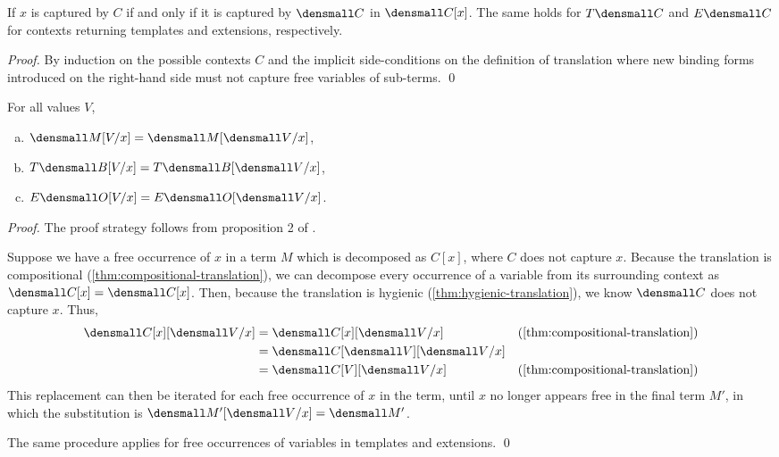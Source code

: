 \begin{lemma}[Hygiene]
  \label{thm:hygienic-translation}

  If $x$ is captured by $C$ if and only if it is captured by $\den{C}$ in $\den{C}{[x]}$.
  The same holds for $T\den{C}$ and $E\den{C}$ for contexts returning templates and extensions, respectively.
\end{lemma}
\begin{proof}
  By induction on the possible contexts $C$ and the implicit side-conditions on the definition of translation where new binding forms introduced on the right-hand side must not capture free variables of sub-terms.
  \qed
\end{proof}

\begin{lemma}[Substitution]
  \label{thm:substitution-translation}
  For all values $V$,
  \begin{enumerate}[(a)]
  \item $\den{M\subst{x}{V}} = \den{M}\subst{x}{\den{V}}$,
  \item $T\den{B\subst{x}{V}} = T\den{B}\subst{x}{\den{V}}$,
  \item $E\den{O\subst{x}{V}} = E\den{O}\subst{x}{\den{V}}$.
  \end{enumerate}
\end{lemma}
\begin{proof}
  The proof strategy follows from proposition 2 of \cite{DownenAriola2014CSCC}.

  Suppose we have a free occurrence of $x$ in a term $M$ which is decomposed as $C[x]$, where $C$ does not capture $x$.
  Because the translation is compositional (\cref{thm:compositional-translation}), we can decompose every occurrence of a variable from its surrounding context as $\den{C[x]} = \den{C}{[x]}$.
  Then, because the translation is hygienic (\cref{thm:hygienic-translation}), we know $\den{C}$ does not capture $x$.
  Thus,
  \begin{align*}
    \den{C[x]}\subst{x}{\den{V}}
    &=
    \den{C}{[x]}\subst{x}{\den{V}}
    &(\cref{thm:compositional-translation})
    \\
    &=
    \den{C}{[\den{V}]}\subst{x}{\den{V}}
    \\
    &=
    \den{C[V]}\subst{x}{\den{V}}
    &(\cref{thm:compositional-translation})
  \end{align*}
  This replacement can then be iterated for each free occurrence of $x$ in the term, until $x$ no longer appears free in the final term $M'$, in which the substitution is $\den{M'}\subst{x}{\den{V}} = \den{M'}$.

  The same procedure applies for free occurrences of variables in templates and extensions.
  \qed
\end{proof}

